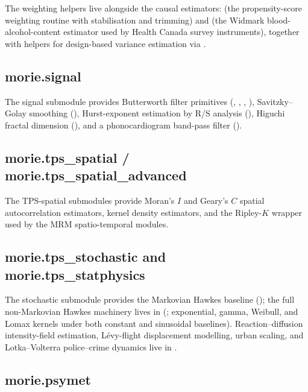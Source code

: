 \documentclass[article,shortnames,nojss]{jss}
\begin{document}
The weighting helpers live alongside the causal estimators:
 (the propensity-score
weighting routine with stabilisation and trimming) and
 (the Widmark
blood-alcohol-content estimator used by Health Canada survey
instruments), together with helpers for design-based variance
estimation via .

\subsection{morie.signal}

The signal submodule provides Butterworth filter primitives
(, , , ),
Savitzky--Golay smoothing (), Hurst-exponent
estimation by R/S analysis (), Higuchi fractal
dimension (), and a phonocardiogram band-pass filter
().

\subsection[morie.tps spatial]{morie.tps\_spatial / morie.tps\_spatial\_advanced}

The TPS-spatial submodules provide Moran's $I$ and Geary's $C$
spatial autocorrelation estimators, kernel density estimators,
and the Ripley-$K$ wrapper used by the MRM spatio-temporal
modules.

\subsection[morie.tps stochastic and statphysics]{morie.tps\_stochastic and morie.tps\_statphysics}

The stochastic submodule  provides
the Markovian Hawkes baseline
(); the full non-Markovian Hawkes
machinery lives in 
(; exponential, gamma, Weibull, and
Lomax kernels under both constant and sinusoidal baselines).
Reaction--diffusion intensity-field estimation, L\'evy-flight
displacement modelling, urban scaling, and Lotka--Volterra
police--crime dynamics live in 
\citep{Mohler2011, Ruhela2026Hawkes}.

\subsection{morie.psymet}
\end{document}
